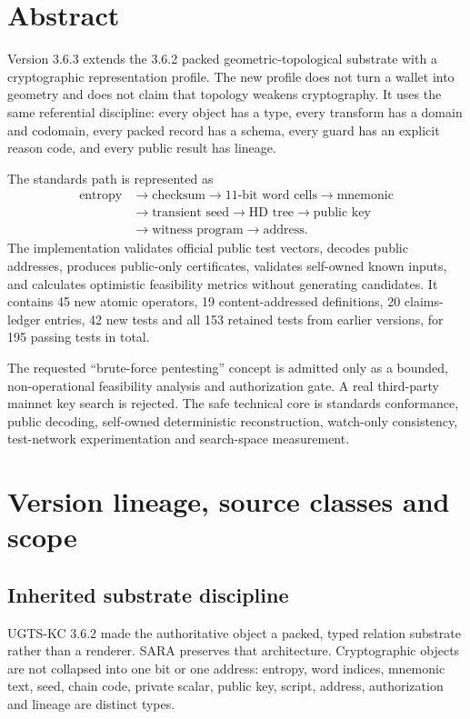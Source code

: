 \documentclass[10pt,a4paper]{article}
\begin{document}
\section*{Abstract}
Version 3.6.3 extends the 3.6.2 packed geometric-topological substrate with a cryptographic representation profile. The new profile does not turn a wallet into geometry and does not claim that topology weakens cryptography. It uses the same referential discipline: every object has a type, every transform has a domain and codomain, every packed record has a schema, every guard has an explicit reason code, and every public result has lineage.

The standards path is represented as
\[
\begin{aligned}
\text{entropy}&\to\text{checksum}\to\text{11-bit word cells}\to\text{mnemonic}\\
&\to\text{transient seed}\to\text{HD tree}\to\text{public key}\\
&\to\text{witness program}\to\text{address}.
\end{aligned}
\]
The implementation validates official public test vectors, decodes public addresses, produces public-only certificates, validates self-owned known inputs, and calculates optimistic feasibility metrics without generating candidates. It contains 45 new atomic operators, 19 content-addressed definitions, 20 claims-ledger entries, 42 new tests and all 153 retained tests from earlier versions, for 195 passing tests in total.

\begin{decisionbox}
The requested ``brute-force pentesting'' concept is admitted only as a bounded, non-operational feasibility analysis and authorization gate. A real third-party mainnet key search is rejected. The safe technical core is standards conformance, public decoding, self-owned deterministic reconstruction, watch-only consistency, test-network experimentation and search-space measurement.
\end{decisionbox}

\tableofcontents
\clearpage
{}

\section{Version lineage, source classes and scope}

\subsection{Inherited substrate discipline}
UGTS-KC 3.6.2 made the authoritative object a packed, typed relation substrate rather than a renderer. SARA preserves that architecture. Cryptographic objects are not collapsed into one bit or one address: entropy, word indices, mnemonic text, seed, chain code, private scalar, public key, script, address, authorization and lineage are distinct types.
\end{document}
